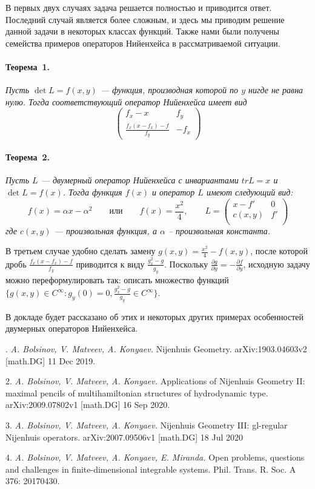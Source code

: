 \documentclass{vzmsthesis}
\begin{document}
В первых двух случаях задача решается полностью и приводится ответ. 
Последний случай является более сложным, и здесь мы приводим решение данной задачи в некоторых классах функций. 
Также нами были получены семейства примеров операторов Нийенхейса в рассматриваемой ситуации. 

\paragraph{Теорема~1.}
{\it
Пусть $\det L = f(x,y)$ --- функция, производная которой по $y$ нигде не равна нулю. Тогда соответствующий оператор Нийенхейса имеет вид 
\begin{equation*}
\begin{pmatrix}
f_x - x & f_y \\
\frac{f_x(x - f_x) - f}{f_y} & -f_x
\end{pmatrix}
\end{equation*}
}

\paragraph{Теорема~2.}
{\it
Пусть $L$ --- двумерный оператор Нийенхейса с инвариантами $tr L = x$ и $\det L = f(x)$. Тогда функция $f(x)$ и оператор $L$ имеют следующий вид:
$$
f(x) = \alpha x - \alpha^2
\qquad
\text{или}
\qquad
f(x) = \frac{x^2}{4},
\qquad
L = 
\begin{pmatrix}
x - f' & 0 \\
c(x,y) & f' \\
\end{pmatrix}
$$
где $c(x,y)$ --- произвольная функция, а $\alpha$ -- произвольная константа. 
}

В третьем случае удобно сделать замену $g(x,y) = \frac{x^2}{4} - f(x,y)$, после которой дробь $\frac{f_x(x - f_x) - f}{f_y}$ приводится 
к виду $\frac{g^2_x - g}{g_y}$. Поскольку $\frac{\partial g}{\partial y} = - \frac{\partial f}{\partial y}$, исходную задачу можно переформулировать так:
описать множество функций $\lbrace g(x,y) \in C^{\infty} : g_y(0) = 0, \frac{g^2_x - g}{g_y} \in C^{\infty} \rbrace$. 

В докладе будет рассказано об этих и некоторых других примерах особенностей двумерных операторов Нийенхейса.

. {\it A. Bolsinov, V. Matveev, A. Konyaev.} Nijenhuis Geometry. arXiv:1903.04603v2 [math.DG] 11 Dec 2019.

2. {\it A. Bolsinov, V. Matveev, A. Konyaev.} Applications of Nijenhuis Geometry II: maximal pencils of multihamiltonian structures of hydrodynamic type. arXiv:2009.07802v1 [math.DG] 16 Sep 2020.

3. {\it A. Bolsinov, V. Matveev, A. Konyaev.} Nijenhuis Geometry III: gl-regular Nijenhuis operators. arXiv:2007.09506v1 [math.DG] 18 Jul 2020

4. {\it A. Bolsinov, V. Matveev, A. Konyaev, E. Miranda.} Open problems, questions and challenges in finite-dimensional integrable systems. Phil. Trans. R. Soc. A 376: 20170430.
\end{document}
